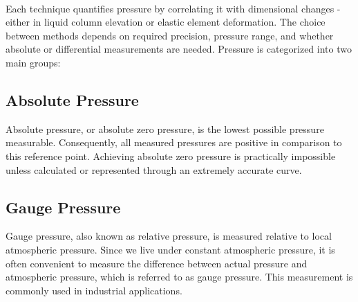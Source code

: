 \documentclass{article}
\begin{document}
\begin{minipage}{1\textwidth}
\begin{minipage}{0.3\textwidth}
\vspace{0.2em}
\end{minipage}
\end{minipage}\\[-0.6em]
Each technique quantifies pressure by correlating it with dimensional changes - either in liquid column elevation or elastic element deformation. The choice between methods depends on required precision, pressure range, and whether absolute or differential measurements are needed.
Pressure is categorized into two main groups:\\
\begin{minipage}{0.49\textwidth}
\subsection{Absolute Pressure}
Absolute pressure, or absolute zero pressure, is the lowest possible pressure measurable. Consequently, all measured pressures are positive in comparison to this reference point. Achieving absolute zero pressure is practically impossible unless calculated or represented through an extremely accurate curve.\end{minipage}\hfill
\begin{minipage}{0.49\textwidth}
\subsection{Gauge Pressure}
Gauge pressure, also known as relative pressure, is measured relative to local atmospheric pressure. Since we live under constant atmospheric pressure, it is often convenient to measure the difference between actual pressure and atmospheric pressure, which is referred to as gauge pressure. This measurement is commonly used in industrial applications.\end{minipage}
\newpage
\end{document}

